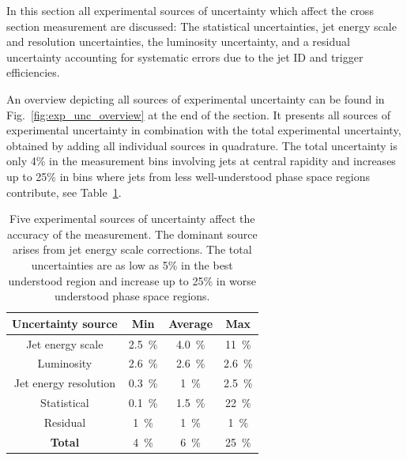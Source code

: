 In this section all experimental sources of uncertainty which affect the cross
section measurement are discussed: The statistical uncertainties, jet energy
scale and resolution uncertainties, the luminosity uncertainty, and
a residual uncertainty accounting for systematic errors due to the jet ID and
trigger efficiencies. 

An overview depicting all sources of experimental uncertainty can be found in
Fig.~\ref{fig:exp_unc_overview} at the end of the section. It presents all
sources of experimental uncertainty in combination with the total experimental
uncertainty, obtained by adding all individual sources in quadrature. The total
uncertainty is only 4\% in the measurement bins involving jets at central
rapidity and increases up to 25\% in bins where jets from less well-understood
phase space regions contribute, see Table~\ref{tab:data:expunc}.

\begin{table}[htbp]
    \centering
    \caption[Summary of experimental uncertainties]
       {Five experimental sources of uncertainty affect the accuracy of the
        measurement. The dominant source arises from jet energy scale
        corrections. The total uncertainties are as low as 5\% in the best understood
        region and increase up to 25\% in worse understood phase space regions.}
    \label{tab:data:expunc}
    \begin{tabular}{cccc}
    \toprule
    \textbf{Uncertainty source} & \textbf{Min}       & \textbf{Average}   & \textbf{Max}\\\midrule
    Jet energy scale            & \SI{2.5}{\percent} & \SI{4.0}{\percent} & \SI{11}{\percent}\\
    Luminosity                  & \SI{2.6}{\percent} & \SI{2.6}{\percent} & \SI{2.6}{\percent}\\
    Jet energy resolution       & \SI{0.3}{\percent} & \SI{1}{\percent} & \SI{2.5}{\percent}\\
    Statistical                 & \SI{0.1}{\percent} & \SI{1.5}{\percent} & \SI{22}{\percent}\\
    Residual                    & \SI{1}{\percent} & \SI{1}{\percent} & \SI{1}{\percent}\\\midrule
    \textbf{Total}              & \SI{4}{\percent} & \SI{6}{\percent} & \SI{25}{\percent}\\
    \bottomrule
    \end{tabular}
\end{table}

